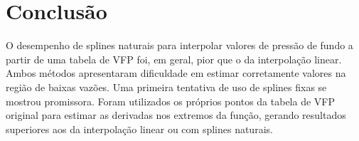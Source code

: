 \documentclass[final,5p]{elsarticle}
\numberwithin{equation}{section}
\begin{document}
    \section{Conclusão}
    
        O desempenho de splines naturais para interpolar valores de pressão de fundo a partir de uma tabela de VFP foi, em geral, pior que o da interpolação linear. Ambos métodos apresentaram dificuldade em estimar corretamente valores na região de baixas vazões. Uma primeira tentativa de uso de splines fixas se mostrou promissora. Foram utilizados os próprios pontos da tabela de VFP original para estimar as derivadas nos extremos da função, gerando resultados superiores aos da interpolação linear ou com splines naturais.

    

\appendix




 








\end{document}
